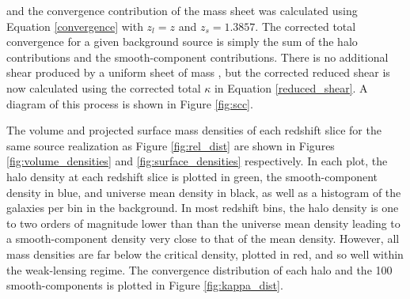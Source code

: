 \documentclass[%
 reprint,
 amsmath,amssymb,
 aps,nofootinbib
]{revtex4-1}
\begin{document}
\noindent and the convergence contribution of the mass sheet was calculated using Equation \eqref{convergence} with ${z_l=z}$ and ${z_s=1.3857}$. The corrected total convergence for a given background source is simply the sum of the halo contributions and the smooth-component contributions. There is no additional shear produced by a uniform sheet of mass \cite{mass_degeneracy}, but the corrected reduced shear is now calculated using the corrected total $\kappa$ in Equation \eqref{reduced_shear}. A diagram of this process is shown in Figure \ref{fig:scc}.

The volume and projected surface mass densities of each redshift slice for the same source realization as Figure \ref{fig:rel_dist} are shown in Figures \ref{fig:volume_densities} and \ref{fig:surface_densities} respectively. In each plot, the halo density at each redshift slice is plotted in green, the smooth-component density in blue, and universe mean density in black, as well as a histogram of the galaxies per bin in the background. In most redshift bins, the halo density is one to two orders of magnitude lower than than the universe mean density leading to a smooth-component density very close to that of the mean density. However, all mass densities are far below the critical density, plotted in red, and so well within the weak-lensing regime. The convergence distribution of each halo and the 100 smooth-components is plotted in Figure \ref{fig:kappa_dist}.
\end{document}
